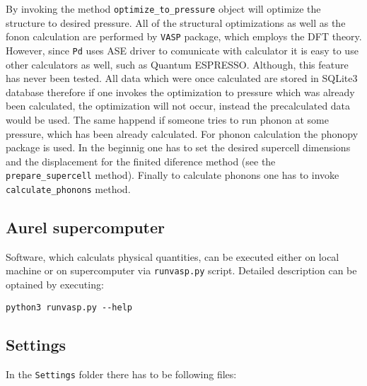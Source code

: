 \documentclass[12pt]{article}
\begin{document}
By invoking the method \texttt{optimize\_to\_pressure}  object will optimize the structure to desired pressure. All of the structural optimizations as well as the fonon calculation are performed by \texttt{VASP}\cite{vasp} package, which employs the DFT theory. However, since \texttt{Pd} uses ASE\cite{ase-paper} driver to comunicate with calculator it is easy to use other calculators as well, such as Quantum ESPRESSO\cite{QE}. Although, this feature has never been tested. All data which were once calculated are stored in SQLite3 database\cite{SQL} therefore if one invokes the optimization to pressure which was already been calculated, the optimization will not occur, instead the precalculated data would be used. The same happend if someone tries to run phonon at some pressure, which has been already calculated. For phonon calculation the phonopy package is used. In the beginnig one has to set the desired supercell dimensions and the displacement for the finited diference method (see the \texttt{prepare\_supercell} method). Finally to calculate phonons one has to invoke \texttt{calculate\_phonons} method.

\subsection{Aurel supercomputer}

Software, which calculats physical quantities, can be executed either on local machine or on supercomputer via \texttt{runvasp.py} script. Detailed description can be optained by executing:

\begin{verbatim}
python3 runvasp.py --help
\end{verbatim}

\subsection{Settings}

In the \texttt{Settings} folder there has to be following files:
\end{document}
